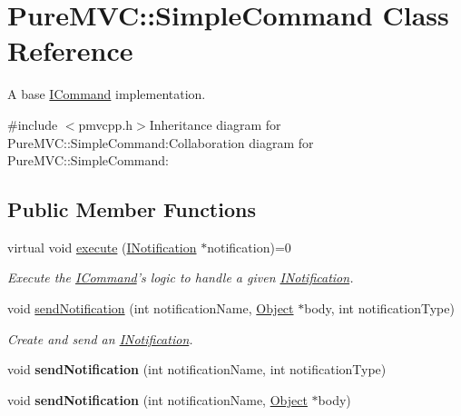\hypertarget{class_pure_m_v_c_1_1_simple_command}{
\section{PureMVC::SimpleCommand Class Reference}
\label{class_pure_m_v_c_1_1_simple_command}
}


A base {\ttfamily \hyperlink{class_pure_m_v_c_1_1_i_command}{ICommand}} implementation.  


{\ttfamily \#include $<$pmvcpp.h$>$}Inheritance diagram for PureMVC::SimpleCommand:Collaboration diagram for PureMVC::SimpleCommand:\subsection*{Public Member Functions}
\begin{DoxyCompactItemize}
\item 
virtual void \hyperlink{class_pure_m_v_c_1_1_simple_command_af3f75f1ff33ba4afabec5ee2a8a83d20}{execute} (\hyperlink{class_pure_m_v_c_1_1_i_notification}{INotification} $\ast$notification)=0
\begin{DoxyCompactList}\small\item\em Execute the {\ttfamily \hyperlink{class_pure_m_v_c_1_1_i_command}{ICommand}}'s logic to handle a given {\ttfamily \hyperlink{class_pure_m_v_c_1_1_i_notification}{INotification}}. \item\end{DoxyCompactList}\item 
void \hyperlink{class_pure_m_v_c_1_1_notifier_a55a358ee2661ecc08400653016fdb497}{sendNotification} (int notificationName, \hyperlink{class_pure_m_v_c_1_1_object}{Object} $\ast$body, int notificationType)
\begin{DoxyCompactList}\small\item\em Create and send an {\ttfamily \hyperlink{class_pure_m_v_c_1_1_i_notification}{INotification}}. \item\end{DoxyCompactList}\item 
\hypertarget{class_pure_m_v_c_1_1_notifier_a6fa2ef42750287b410dcdd867479450b}{
void {\bfseries sendNotification} (int notificationName, int notificationType)}
\label{class_pure_m_v_c_1_1_notifier_a6fa2ef42750287b410dcdd867479450b}

\item 
\hypertarget{class_pure_m_v_c_1_1_notifier_a79a17268f222d42c1cc1f41a13da3b62}{
void {\bfseries sendNotification} (int notificationName, \hyperlink{class_pure_m_v_c_1_1_object}{Object} $\ast$body)}
\label{class_pure_m_v_c_1_1_notifier_a79a17268f222d42c1cc1f41a13da3b62}


\end{DoxyCompactItemize}
